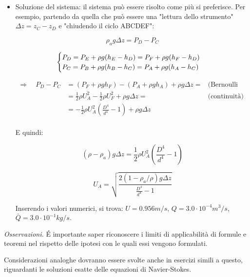\begin{itemize}
\item Soluzione del sistema: il sistema può essere risolto come più si preferisce. Per esempio, partendo da quella che può essere una "lettura dello strumento" $\Delta z = z_C - z_D$ e "chiudendo il ciclo ABCDEF":

\begin{equation}
  \rho_a g \Delta z = P_D - P_C
\end{equation}

\begin{equation}
  \begin{cases}
    P_D = P_E + \rho g (h_E - h_D) = P_F + \rho g (h_F - h_D)\\
    P_C = P_B + \rho g (h_B - h_C) = P_A + \rho g (h_A - h_C)\\
  \end{cases} \\
\end{equation}

\begin{equation}
\begin{aligned}
  \Rightarrow \quad P_D - P_C & = (P_F + \rho g h_F) - (P_A + \rho g h_A) + \rho g \Delta z = 
  & \text{(Bernoulli A-F)}\\
   & = \frac{1}{2}\rho U_A^2 - \frac{1}{2}\rho U_F^2 + \rho g \Delta z = 
  & \text{(continuità)}\\
   & = -\frac{1}{2}\rho U_A^2 \displaystyle\left( \frac{D^4}{d^4} - 1 \right) + \rho g \Delta z \\
\end{aligned}
\end{equation}

E quindi: 

\begin{equation}
  (\rho - \rho_a ) g \Delta z = \frac{1}{2}\rho U_A^2 \displaystyle\left( \frac{D^4}{d^4} - 1 \right)
\end{equation}

\begin{equation}
  U_A = \displaystyle\sqrt{\frac{2 (1 - \rho_a / \rho) g \Delta z}{\frac{D^4}{d^4} - 1}}
\end{equation}

Inserendo i valori numerici, si trova: $U = 0.956 m/s$, $Q = 3.0 \cdot 10^{-4} m^3/s$, $\bar{Q} = 3.0 \cdot 10^{-1} kg/s$.

\end{itemize}


\textit{Osservazioni.} \'E importante saper riconoscere i limiti di applicabilità di formule e teoremi nel rispetto delle ipotesi con le quali essi vengono formulati.

Considerazioni analoghe dovranno essere svolte anche in esercizi simili a questo, riguardanti le soluzioni esatte delle equazioni di Navier-Stokes.
